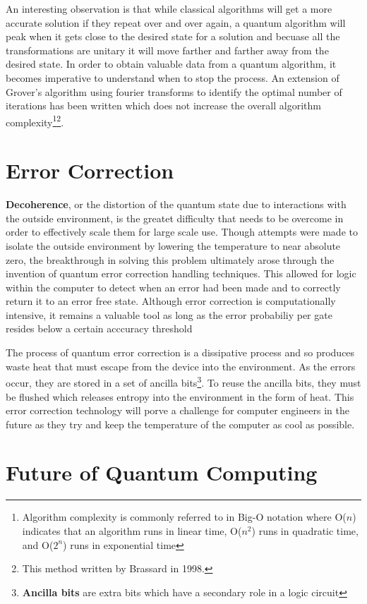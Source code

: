 \documentclass[12pt]{article}
\begin{document}
An interesting observation is that while classical algorithms will get a more accurate solution if they repeat over and over again, a quantum algorithm will peak when it gets close to the desired state for a solution and becuase all the transformations are unitary it will move farther and farther away from the desired state. In order to obtain valuable data from a quantum algorithm, it becomes imperative to understand when to stop the process. An extension of Grover's algorithm using fourier transforms to identify the optimal number of iterations has been written which does not increase the overall algorithm complexity\footnote{Algorithm complexity is commonly referred to in Big-O notation where O($n$) indicates that an algorithm runs in linear time, O($n^2$) runs in quadratic time, and O($2^n$) runs in exponential time}\footnote{This method written by Brassard in 1998\cite{non}.}.
\section{Error Correction}
\textbf{Decoherence}, or the distortion of the quantum state due to interactions with the outside environment, is the greatet difficulty that needs to be overcome in order to effectively scale them for large scale use.\cite{non} Though attempts were made to isolate the outside environment by lowering the temperature to near absolute zero, the breakthrough in solving this problem ultimately arose through the invention of quantum error correction handling techniques. This allowed for logic within the computer to detect when an error had been made and to correctly return it to an error free state. Although error correction is computationally intensive, it remains a valuable tool as long as the error probabiliy per gate resides below a certain acccuracy threshold
\par
The process of quantum error correction is a dissipative process and so produces waste heat that must escape from the device into the environment. As the errors occur, they are stored in a set of ancilla bits\footnote{\textbf{Ancilla bits} are extra bits which have a secondary role in a logic circuit}. To reuse the ancilla bits, they must be flushed which releases entropy into the environment in the form of heat.\cite{pro} This error correction technology will porve a challenge for computer engineers in the future as they try and keep the temperature of the computer as cool as possible.\par
\section{Future of Quantum Computing}
\end{document}
